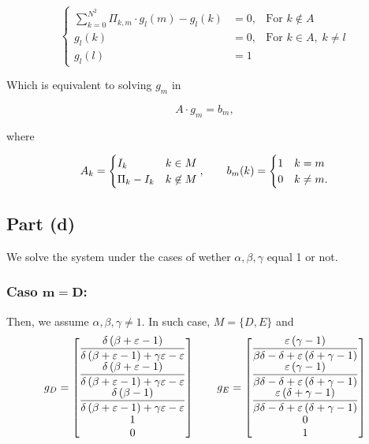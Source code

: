 \[ \left\{\begin{array}{ccl}
    \sum_{k = 0}^{N^2} \Pi_{k,m} \cdot g_l(m) - g_l(k) & = 0, & \mbox{For }k \not\in A\\
    g_l(k) & = 0, & \mbox{For }k \in A,\; k\neq l\\
    g_l(l) & = 1
\end{array}\right. \]

Which is equivalent to solving $g_m$ in

\[ A \cdot g_m = b_m, \]

where

\[ A_{k} = \begin{cases}
    I_k & k\in M\\
    \Pi_{k}-I_k & k\not\in M
\end{cases},\hspace*{2em} b_m(k) = \begin{cases}
    1 & k = m\\
    0 & k\neq m.
\end{cases} \]

\subsection*{Part (d)}

We solve the system under the cases of wether $\alpha,\beta,\gamma$ equal 1 or not.

\subsubsection*{Caso $\boldsymbol{m = D}$:}
Then, we assume $\alpha,\beta,\gamma \neq 1$. In such case, $M = \{D,E\}$ and
\renewcommand*{\arraystretch}{2.5}
\[\everymath{\displaystyle}  g_D =  \left[\begin{matrix}\frac{\delta \left(\beta + \varepsilon - 1\right)}{\delta \left(\beta + \varepsilon - 1\right) + \gamma \varepsilon - \varepsilon}\\\frac{\delta \left(\beta + \varepsilon - 1\right)}{\delta \left(\beta + \varepsilon - 1\right) + \gamma \varepsilon - \varepsilon}\\\frac{\delta \left(\beta - 1\right)}{\delta \left(\beta + \varepsilon - 1\right) + \gamma \varepsilon - \varepsilon}\\1\\0\end{matrix}\right]
\hspace*{2em}
g_E = \left[\begin{matrix}\frac{\varepsilon \left(\gamma - 1\right)}{\beta \delta - \delta + \varepsilon \left(\delta + \gamma - 1\right)}\\\frac{\varepsilon \left(\gamma - 1\right)}{\beta \delta - \delta + \varepsilon \left(\delta + \gamma - 1\right)}\\\frac{\varepsilon \left(\delta + \gamma - 1\right)}{\beta \delta - \delta + \varepsilon \left(\delta + \gamma - 1\right)}\\0\\1\end{matrix}\right]
\]

